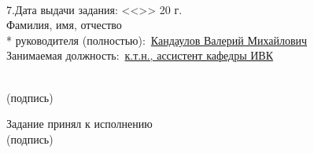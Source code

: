 \begin{titlepage}
\noindent \underline{\hspace{\textwidth}}
\noindent \underline{\hspace{\textwidth}}
\noindent \underline{\hspace{\textwidth}}
\noindent \underline{\hspace{\textwidth}}\\

\noindent 7.Дата выдачи задания: <<\underline{\hspace{1cm}}>>\underline{\hspace{3.5cm}} 20\underline{\hspace{0.8cm}} г.\\

\noindent Фамилия, имя, отчество\\*
руководителя (полностью):~\uline{Кандаулов Валерий Михайлович\hfill}\\
\noindent Занимаемая должность:~\uline{к.т.н., ассистент кафедры ИВК\hfill}
\begin{flushright}
  \underline{\hspace{5cm}}\\
  \small
  (подпись)\hspace*{1.5cm}
  \normalsize
\end{flushright}


\noindent Задание принял к исполнению~\uline{\hfill}\\
\hspace*{11.5cm}
\small
(подпись)
\normalsize
\end{titlepage}
